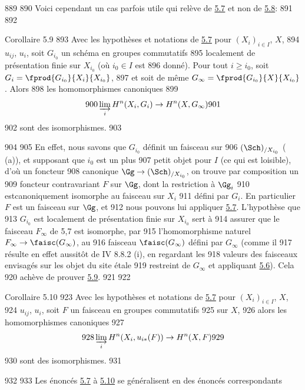    889	
   890	Voici cependant un cas parfois utile qui relève de \hyperref[VII.thm5.7]{5.7} et non de \hyperref[VII.cor5.8]{5.8}:
   891	
   892	\begin{enonce*}{Corollaire 5.9}
   893	Avec les hypothèses et notations de \hyperref[VII.thm5.7]{5.7} pour $(X_i)_{i \in I}$, $X$,
   894	$u_{ij}$, $u_i$, soit $G_{i_0}$ un schéma en groupes commutatifs
   895	localement de présentation finie sur $X_{i_0}$ (où $i_0 \in I$ est
   896	donné). Pour tout $i \geq i_0$, soit $G_i = \fprod{G_{i_0}}{X_i}{X_{i_0}}$,
   897	et soit de même $G_{\infty} = \fprod{G_{i_0}}{X}{X_{i_0}}$. Alors
   898	les homomorphismes canoniques
   899	$$
   900	\varinjlim_i H^n (X_i, G_i) \to H^n (X, G_{\infty})
   901	$$
   902	sont des isomorphismes.
   903	\end{enonce*}
   904	
   905	En effet, nous savons que $G_{i_0}$ définit un faisceau sur
   906	$(\Sch)_{/X_{i_0}}$ ( (a)), et supposant que $i_0$ est un plus
   907	petit objet pour $I$ (ce qui est loisible), d'où un foncteur
   908	canonique $\Gg \to (\Sch)_{/X_{i_0}}$, on trouve par composition un
   909	foncteur contravariant $F$ sur $\Gg$, dont la restriction à $\Gg_i$
   910	est\pageoriginale canoniquement isomorphe au faisceau sur $X_i$
   911	défini par $G_i$. En particulier $F$ est un faisceau sur $\Gg$, et
   912	nous pouvons lui appliquer \hyperref[VII.thm5.7]{5.7}. L'hypothèse que
   913	$G_{i_0}$ est localement de présentation finie sur $X_{i_0}$ sert à
   914	assurer que le faisceau $F_{\infty}$ de 5,7 est isomorphe, par
   915	l'homomorphisme naturel $F_{\infty} \to \faisc(G_{\infty})$, au
   916	faisceau $\faisc(G_{\infty})$ défini par $G_{\infty}$ (comme il
   917	résulte en effet aussitôt de \EGA IV 8.8.2 (i), en regardant les
   918	valeurs des faisceaux envisagés sur les objet du site étale
   919	restreint de $G_{\infty}$ et appliquant \hyperref[VII.lem5.6]{5.6}). Cela
   920	achève de prouver \hyperref[VII.cor5.9]{5.9}.
   921	
   922	\begin{enonce*}{Corollaire 5.10}
   923	Avec les hypothèses et notations de \hyperref[VII.thm5.7]{5.7} pour $(X_i)_{i \in I}$, $X$,
   924	$u_{ij}$, $u_i$, soit $F$ un faisceau en groupes commutatifs
   925	 sur $X$,
   926	alors les homomorphismes canoniques
   927	$$
   928	\varinjlim_{i} H^n (X_i, u_{i\ast} (F)) \to H^n (X, F)
   929	$$
   930	sont des isomorphismes.
   931	\end{enonce*}
   932	
   933	Les énoncés \hyperref[VII.thm5.7]{5.7} à \hyperref[VII.cor5.10]{5.10} se généralisent en des énoncés correspondants
